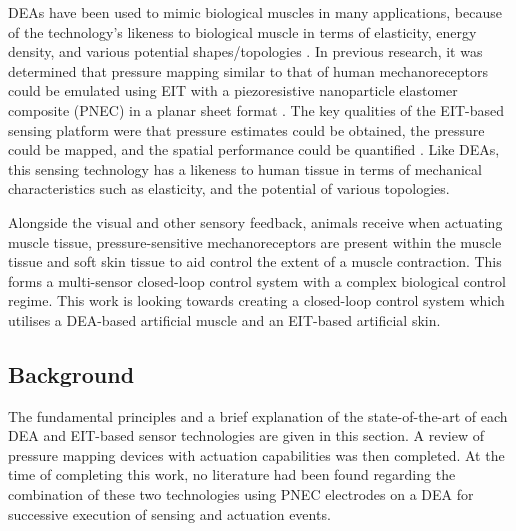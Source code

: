 	DEAs have been used to mimic biological muscles in many applications, because of the technology's likeness to biological muscle in terms of elasticity, energy density, and various potential shapes/topologies \cite{Rosset2016, Hajiesmaili2021, Guo2021} . In previous research, it was determined that pressure mapping similar to that of human mechanoreceptors could be emulated using EIT with a piezoresistive nanoparticle elastomer composite (PNEC) in a planar sheet format\cite{Ellingham2022} . The key qualities of the EIT-based sensing platform were that pressure estimates could be obtained, the pressure could be mapped, and the spatial performance could be quantified\cite{Ellingham2024} . Like DEAs, this sensing technology has a likeness to human tissue in terms of mechanical characteristics such as elasticity, and the potential of various topologies.
	
	Alongside the visual and other sensory feedback, animals receive when actuating muscle tissue, pressure-sensitive mechanoreceptors are present within the muscle tissue and soft skin tissue to aid control the extent of a muscle contraction. This forms a multi-sensor closed-loop control system with a complex biological control regime. This work is looking towards creating a closed-loop control system which utilises a DEA-based artificial muscle and an EIT-based artificial skin.
	
	
	\subsection{Background} 
	\label{subsec:background}
	The fundamental principles and a brief explanation of the state-of-the-art of each DEA and EIT-based sensor technologies are given in this section. A review of pressure mapping devices with actuation capabilities was then completed. At the time of completing this work, no literature had been found regarding the combination of these two technologies using PNEC electrodes on a DEA for successive execution of sensing and actuation events.  
	
